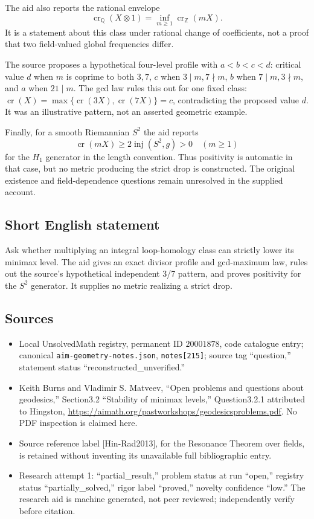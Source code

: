 \documentclass[11pt]{article}
\newcommand{\Z}{\mathbb{Z}}
\newcommand{\Q}{\mathbb{Q}}
\begin{document}
The aid also reports the rational envelope
\[
 \operatorname{cr}_{\Q}(X\otimes1)
 =\inf_{m\geq1}\operatorname{cr}_{\Z}(mX).
\]
It is a statement about this class under rational change of coefficients, not a proof that two field-valued global frequencies differ.

The source proposes a hypothetical four-level profile with \(a<b<c<d\): critical value \(d\) when \(m\) is coprime to both \(3,7\), \(c\) when \(3\mid m,7\nmid m\), \(b\) when \(7\mid m,3\nmid m\), and \(a\) when \(21\mid m\). The gcd law rules this out for one fixed class: \(\operatorname{cr}(X)=\max\{\operatorname{cr}(3X),\operatorname{cr}(7X)\}=c\), contradicting the proposed value \(d\). It was an illustrative pattern, not an asserted geometric example.

Finally, for a smooth Riemannian \(S^2\) the aid reports
\[
 \operatorname{cr}(mX)\geq2\operatorname{inj}(S^2,g)>0
 \quad(m\geq1)
\]
for the \(H_1\) generator in the length convention. Thus positivity is automatic in that case, but no metric producing the strict drop is constructed. The original existence and field-dependence questions remain unresolved in the supplied account.
\subsection{Short English statement}
Ask whether multiplying an integral loop-homology class can strictly lower its minimax level. The aid gives an exact divisor profile and gcd-maximum law, rules out the source's hypothetical independent 3/7 pattern, and proves positivity for the \(S^2\) generator. It supplies no metric realizing a strict drop.
\subsection{Sources}
\begin{itemize}
\item Local UnsolvedMath registry, permanent ID \(20001878\), code catalogue entry; canonical \texttt{aim-geometry-notes.json}, \texttt{notes[215]}; source tag ``question,'' statement status ``reconstructed\_unverified.''
\item Keith Burns and Vladimir S. Matveev, ``Open problems and questions about geodesics,'' Section3.2 ``Stability of minimax levels,'' Question3.2.1 attributed to Hingston, \url{https://aimath.org/pastworkshops/geodesicsproblems.pdf}. No PDF inspection is claimed here.
\item Source reference label [Hin-Rad2013], for the Resonance Theorem over fields, is retained without inventing its unavailable full bibliographic entry.
\item Research attempt 1: ``partial\_result,'' problem status at run ``open,'' registry status ``partially\_solved,'' rigor label ``proved,'' novelty confidence ``low.'' The research aid is machine generated, not peer reviewed; independently verify before citation.
\end{itemize}
\end{document}
